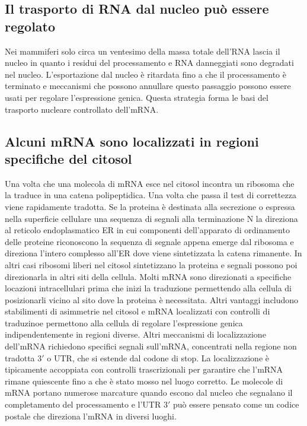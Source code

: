 \subsection{Il trasporto di RNA dal nucleo pu\`o essere regolato}
Nei mammiferi solo circa un ventesimo della massa totale dell'RNA lascia il nucleo in quanto i residui del processamento e RNA danneggiati sono degradati nel nucleo. L'esportazione
dal nucleo \`e ritardata fino a che il processamento \`e terminato e meccanismi che possono annullare questo passaggio possono essere usati per regolare l'espressione genica. Questa
strategia forma le basi del trasporto nucleare controllato dell'mRNA.
\subsection{Alcuni mRNA sono localizzati in regioni specifiche del citosol}
Una volta che una molecola di mRNA esce nel citosol incontra un ribosoma che la traduce in una catena polipeptidica. Una volta che passa il test di correttezza viene rapidamente 
tradotta. Se la proteina \`e destinata alla secrezione o espressa nella superficie cellulare una sequenza di segnali alla terminazione N la direziona al reticolo endoplasmatico ER in 
cui componenti dell'apparato di ordinamento delle proteine riconoscono la sequenza di segnale appena emerge dal ribosoma e direziona l'intero complesso all'ER dove viene sintetizzata
la catena rimanente. In altri casi ribosomi liberi nel citosol sintetizzano la proteina e segnali possono poi direzionarla in altri siti della cellula. Molti mRNA sono direzionati a
specifiche locazioni intracellulari prima che inizi la traduzione permettendo alla cellula di posizionarli vicino al sito dove la proteina \`e necessitata. Altri vantaggi includono
stabilimenti di asimmetrie nel citosol e mRNA localizzati con controlli di traduzinoe permettono alla cellula di regolare l'espressione genica indipendentemente in regioni diverse.
Altri meccanismi di localizzazione dell'mRNA richiedono specifici segnali sull'mRNA, concentrati nella regione non tradotta $3'$ o UTR, che si estende dal codone di stop. La 
localizzazione \`e tipicamente accoppiata con controlli trascrizionali per garantire che l'mRNA rimane quiescente fino a che \`e stato mosso nel luogo corretto. Le molecole di mRNA 
portano numerose marcature quando escono dal nucleo che segnalano il completamento del processamento e l'UTR $3'$ pu\`o essere pensato come un codice postale che direziona l'mRNA in
diversi luoghi. 
